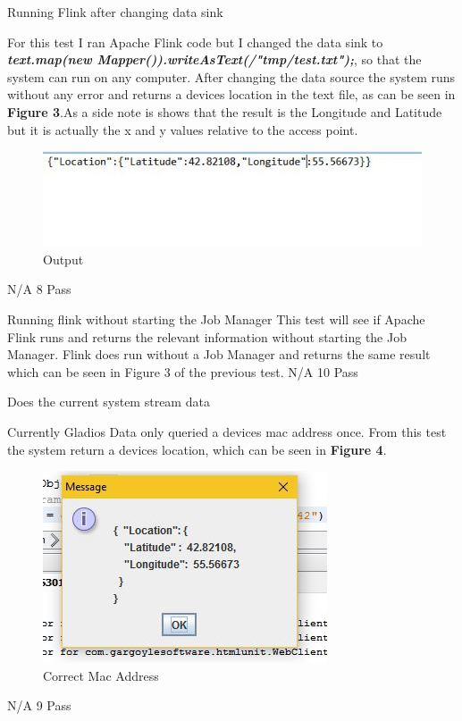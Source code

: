\FuncReq
{Running Flink after changing data sink}
{For this test I ran Apache Flink code but I changed the data sink to \textbf{\textit{  text.map(new Mapper()).writeAsText(/"tmp/test.txt");}}, so that the system can run on any computer. After changing the data source the system runs without any error and returns a devices location in the text file, as can be seen in \textbf{Figure 3}.As a side note is shows that the result is the Longitude and Latitude but it is actually the x and y values relative to the access point.
		\begin{figure}[h]
			\centering
			\includegraphics{functional/images/query_location_results.jpg}
			\caption{Output}
			\label{fig:Output}
		\end{figure} 
}		
{N/A}
{8}
{Pass}
		
\FuncReq
{Running flink without starting the Job Manager}
{This test will see if Apache Flink runs and returns the relevant information without starting the Job Manager. Flink does run without a Job Manager and returns the same result which can be seen in Figure 3 of the previous test.}
{N/A}
{10}
{Pass}

\FuncReq
{Does the current system stream data}
{Currently Gladios Data only queried a devices mac address once. From this test the system return a devices location, which can be seen in \textbf{Figure 4}.
		\begin{figure}[h]
			\centering
			\includegraphics{functional/images/right_mac.jpg}
			\caption{Correct Mac Address}
			\label{fig:right_mac}
		\end{figure} 
}
{N/A}
{9}	
{Pass}	
	
